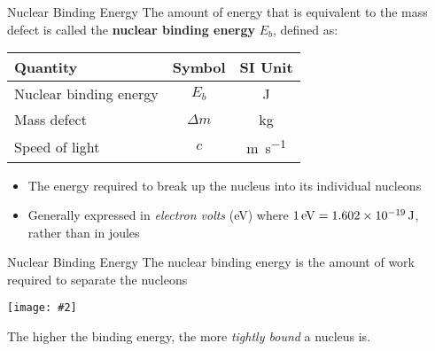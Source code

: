 \documentclass[12pt,compress,aspectratio=169]{beamer}
\newcommand{\pic}[2]{\texttt{[image: \#2]}}
\newcommand{\eq}[2]{
  \vspace{#1}{\Large\begin{displaymath}#2\end{displaymath}}
}
\begin{document}
\begin{frame}{Nuclear Binding Energy}
  The amount of energy that is equivalent to the mass defect is called the
  \textbf{nuclear binding energy} $E_b$, defined as:

  \eq{-.2in}{
    \boxed{E_b=(\Delta m)c^2}
  }
  \begin{center}
    \begin{tabular}{l|c|c}
      \rowcolor{pink}
      \textbf{Quantity}      & \textbf{Symbol} & \textbf{SI Unit} \\ \hline
      Nuclear binding energy & $E_b$      & \si{\joule}\\
      Mass defect            & $\Delta m$ & \si{\kilo\gram}\\
      Speed of light         & $c$        & \si{\metre\per\second}
    \end{tabular}
  \end{center}
  \begin{itemize}
  \item The energy required to break up the nucleus into its individual
    nucleons
  \item Generally expressed in \emph{electron volts} (\si{\electronvolt})
    where $\SI1{\electronvolt}=\SI{1.602e-19}{\joule}$, rather than in joules
  \end{itemize}
\end{frame}



\begin{frame}{Nuclear Binding Energy}
  The nuclear binding energy is the amount of work required to separate the
  nucleons
  \begin{center}
    \pic{.5}{graphics/CNX_UPhysics_43_02_BindEnergy}
  \end{center}
  The higher the binding energy, the more \emph{tightly bound} a nucleus is.
\end{frame}
\end{document}
